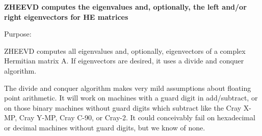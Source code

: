 {\bfseries  Z\+H\+E\+E\+V\+D computes the eigenvalues and, optionally, the left and/or right eigenvectors for H\+E matrices} 

 \begin{DoxyParagraph}{Purpose\+: }
\begin{DoxyVerb} ZHEEVD computes all eigenvalues and, optionally, eigenvectors of a
 complex Hermitian matrix A.  If eigenvectors are desired, it uses a
 divide and conquer algorithm.

 The divide and conquer algorithm makes very mild assumptions about
 floating point arithmetic. It will work on machines with a guard
 digit in add/subtract, or on those binary machines without guard
 digits which subtract like the Cray X-MP, Cray Y-MP, Cray C-90, or
 Cray-2. It could conceivably fail on hexadecimal or decimal machines
 without guard digits, but we know of none.\end{DoxyVerb}
 
\end{DoxyParagraph}

